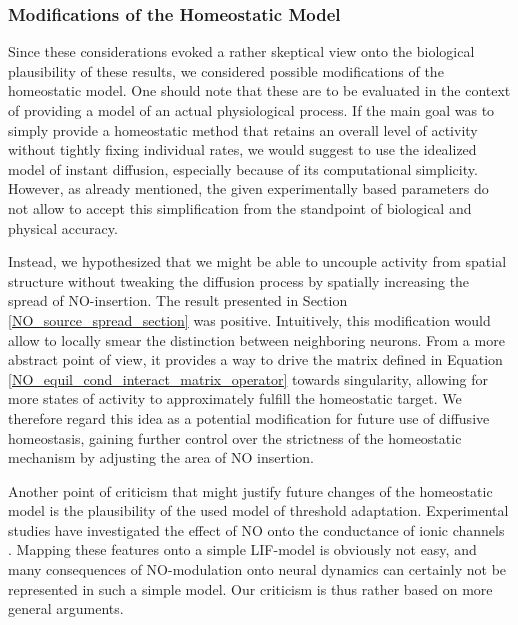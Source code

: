 \documentclass[10pt,a4paper]{article}
\begin{document}
\subsubsection{Modifications of the Homeostatic Model}\label{Possible_Modifications_Section}
Since these considerations evoked a rather skeptical view onto the biological plausibility of these results, we considered possible modifications of the homeostatic model. One should note that these are to be evaluated in the context of providing a model of an actual physiological process. If the main goal was to simply provide a homeostatic method that retains an overall level of activity without tightly fixing individual rates, we would suggest to use the idealized model of instant diffusion, especially because of its computational simplicity. However, as already mentioned, the given experimentally based parameters do not allow to accept this simplification from the standpoint of biological and physical accuracy.

Instead, we hypothesized that we might be able to uncouple activity from spatial structure without tweaking the diffusion process by spatially increasing the spread of NO-insertion. The result presented in Section \ref{NO_source_spread_section} was positive. Intuitively, this modification would allow to locally smear the distinction between neighboring neurons. From a more abstract point of view, it provides a way to drive the matrix defined in Equation \eqref{NO_equil_cond_interact_matrix_operator} towards singularity, allowing for more states of activity to approximately fulfill the homeostatic target. We therefore regard this idea as a potential modification for future use of diffusive homeostasis, gaining further control over the strictness of the homeostatic mechanism by adjusting the area of NO insertion.

Another point of criticism that might justify future changes of the homeostatic model is the plausibility of the used model of threshold adaptation. Experimental studies have investigated the effect of NO onto the conductance of ionic channels \cite{Steinert_NO,Steinert_NO_2011}. Mapping these features onto a simple LIF-model is obviously not easy, and many consequences of NO-modulation onto neural dynamics can certainly not be represented in such a simple model. Our criticism is thus rather based on more general arguments.
\end{document}
